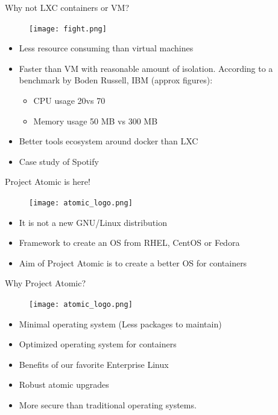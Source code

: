 \documentclass{beamer}
\begin{document}
\begin{frame}{Why not LXC containers or VM?}
\begin{figure}[htp]
\centering
\texttt{[image: fight.png]}
\label{}
\end{figure}
\begin{itemize}
  \item Less resource consuming than virtual machines
  \item Faster than VM with reasonable amount of isolation. According to a benchmark by Boden Russell, IBM (approx figures):
  \begin{itemize}
    \item CPU usage 20\percent vs 70\percent
    \item Memory usage 50 MB vs 300 MB
  \end{itemize}    
  \item Better tools ecosystem around docker than LXC
  \item Case study of Spotify
\end{itemize}
\end{frame}

\begin{frame}{Project Atomic is here!}
\begin{figure}[htp]
\centering
\texttt{[image: atomic\_logo.png]}
\label{}
\end{figure}
\begin{itemize}
  \item It is not a new GNU/Linux distribution
  \item Framework to create an OS from RHEL, CentOS or Fedora
  \item Aim of Project Atomic is to create a better OS for containers
\end{itemize}
\end{frame}

\begin{frame}{Why Project Atomic?}
\begin{figure}[htp]
\centering
\texttt{[image: atomic\_logo.png]}
\label{}
\end{figure}
\begin{itemize}
  \item Minimal operating system (Less packages to maintain)
  \item Optimized operating system for containers
  \item Benefits of our favorite Enterprise Linux
  \item Robust atomic upgrades
  \item More secure than traditional operating systems.
\end{itemize}
\end{frame}
\end{document}
